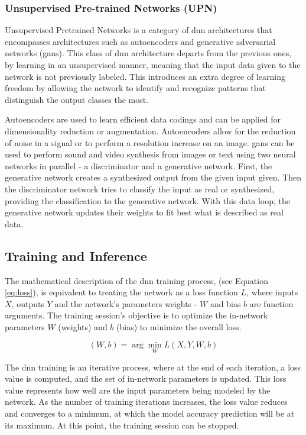 \subsubsection{Unsupervised Pre-trained Networks (UPN)}
Unsupervised Pretrained Networks is a category of \acrshort{dnn} architectures that encompasses architectures such as autoencoders and generative adversarial networks (\acrshort{gan}s). This class of \acrshort{dnn} architecture departs from the previous ones, by learning in an unsupervised manner, meaning that the input data given to the network is not previously labeled. This introduces an extra degree of learning freedom by allowing the network to identify and recognize patterns that distinguish the output classes the most.

Autoencoders are used to learn efficient data codings and can be applied for dimensionality reduction or augmentation. Autoencoders allow for the reduction of noise in a signal or to perform a resolution increase on an image. \acrshort{gan}s can be used to perform sound and video synthesis from images or text using two neural networks in parallel - a discriminator and a generative network. First, the generative network creates a synthesized output from the given input given. Then the discriminator network tries to classify the input as real or synthesized, providing the classification to the generative network. With this data loop, the generative network updates their weights to fit best what is described as real data.


\subsection{Training and Inference}

The mathematical description of the \acrshort{dnn} training process, (see Equation \ref{eq:loss}), is equivalent to treating the network as a loss function $L$, where inputs $X$, outputs $Y$ and the network's parameters weights - $W$ and bias $b$ are function arguments. The training session's objective is to optimize the in-network parameters  $W$ (weights) and $b$ (bias) to minimize the overall loss.

\begin{equation}
    \label{eq:loss}
    (W,b) = \arg\min_{W} L(X,Y,W,b)
\end{equation}

The \acrshort{dnn} training is an iterative process, where at the end of each iteration, a loss value is computed, and the set of in-network parameters is updated. This loss value represents how well are the input parameters being modeled by the network. As the number of training iterations increases, the loss value reduces and converges to a minimum, at which the model accuracy prediction will be at its maximum. At this point, the training session can be stopped.

